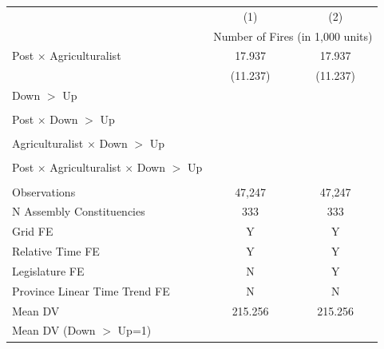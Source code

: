 {
\def\sym#1{\ifmmode^{#1}\else\(^{#1}\)\fi}
\begin{tabular}{l*{2}{c}}
\hline
            &\multicolumn{1}{c}{(1)}         &\multicolumn{1}{c}{(2)}         \\
            & \multicolumn{2}{c}{Number of Fires (in 1,000 units)} \\ \hline

Post $\times$ Agriculturalist&      17.937         &      17.937         \\
            &    (11.237)         &    (11.237)         \\
Down $>$ Up &                     &                     \\
            &                     &                     \\
Post $\times$ Down $>$ Up&                     &                     \\
            &                     &                     \\
Agriculturalist $\times$ Down $>$ Up&                     &                     \\
            &                     &                     \\
Post $\times$ Agriculturalist $\times$ Down $>$ Up&                     &                     \\
            &                     &                     \\
\hline
Observations&      47,247         &      47,247         \\
N Assembly Constituencies&         333         &         333         \\
Grid FE     &           Y         &           Y         \\
Relative Time FE&           Y         &           Y         \\
Legislature FE&           N         &           Y         \\
Province Linear Time Trend FE&           N         &           N         \\
Mean DV     &     215.256         &     215.256         \\
Mean DV (Down $>$ Up=1)&                     &                     \\
\hline
\end{tabular}
}

